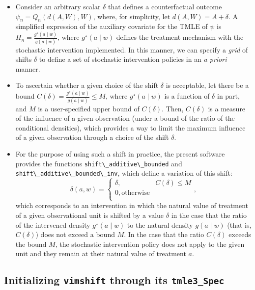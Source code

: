 \documentclass[
  12pt, krantz2,
]{book}
\newcommand{\passthrough}[1]{#1}
\theoremstyle{definition}
\theoremstyle{definition}
\theoremstyle{definition}
\newcommand{\1}{\mathbbm{1}}
\begin{document}
\begin{itemize}
\item
  Consider an arbitrary scalar \(\delta\) that defines a counterfactual outcome
  \(\psi_n = Q_n(d(A, W), W)\), where, for simplicity, let \(d(A, W) = A + \delta\).
  A simplified expression of the auxiliary covariate for the TMLE of \(\psi\) is
  \(H_n = \frac{g^{\star}(a \mid w)}{g(a \mid w)}\), where \(g^{\star}(a \mid w)\)
  defines the treatment mechanism with the stochastic intervention implemented.
  In this manner, we can specify a \emph{grid} of shifts \(\delta\) to define a set of
  stochastic intervention policies in an \emph{a priori} manner.
\item
  To ascertain whether a given choice of the shift \(\delta\) is acceptable, let
  there be a bound \(C(\delta) = \frac{g^{\star}(a \mid w)}{g(a \mid w)} \leq M\),
  where \(g^{\star}(a \mid w)\) is a function of \(\delta\) in part, and \(M\) is a
  user-specified upper bound of \(C(\delta)\). Then, \(C(\delta)\) is a measure of
  the influence of a given observation (under a bound of the ratio of the
  conditional densities), which provides a way to limit the maximum influence of
  a given observation through a choice of the shift \(\delta\).
\item
  For the purpose of using such a shift in practice, the present software
  provides the functions \passthrough{\lstinline!shift\_additive\_bounded!} and
  \passthrough{\lstinline!shift\_additive\_bounded\_inv!}, which define a variation of this shift:
  \begin{equation}
    \delta(a, w) =
      \begin{cases}
        \delta, & C(\delta) \leq M \\
        0, \text{otherwise} \\
      \end{cases},
  \end{equation}
  which corresponds to an intervention in which the natural value of treatment
  of a given observational unit is shifted by a value \(\delta\) in the case that
  the ratio of the intervened density \(g^{\star}(a \mid w)\) to the natural
  density \(g(a \mid w)\) (that is, \(C(\delta)\)) does not exceed a bound \(M\). In
  the case that the ratio \(C(\delta)\) exceeds the bound \(M\), the stochastic
  intervention policy does not apply to the given unit and they remain at their
  natural value of treatment \(a\).
\end{itemize}

\hypertarget{initializing-vimshift-through-its-tmle3_spec}{%
\subsection{\texorpdfstring{Initializing \texttt{vimshift} through its \texttt{tmle3\_Spec}}{Initializing vimshift through its tmle3\_Spec}}\label{initializing-vimshift-through-its-tmle3_spec}}
\end{document}

